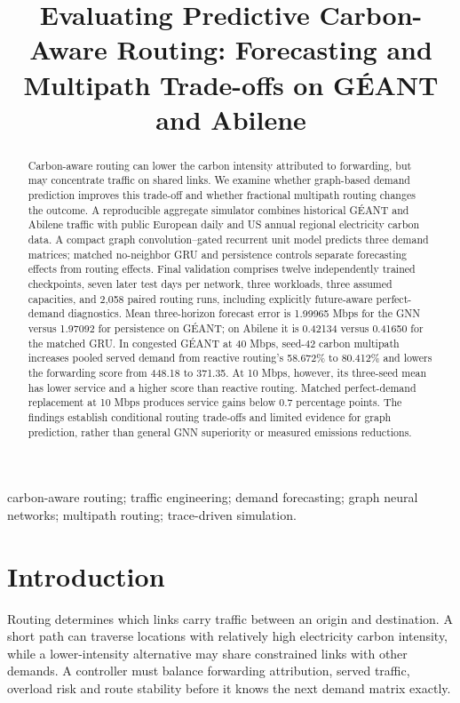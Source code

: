 \documentclass[conference,letterpaper]{IEEEtran}
\title{Evaluating Predictive Carbon-Aware Routing:
Forecasting and Multipath Trade-offs on G\'{E}ANT and Abilene}
\author{\IEEEauthorblockN{Ashutosh Gupta}
\and\IEEEauthorblockN{Tanay Mohta}
\and\IEEEauthorblockN{Avaneesh Chavan}}
\begin{document}
\maketitle

\begin{abstract}
Carbon-aware routing can lower the carbon intensity attributed to forwarding, but may concentrate traffic on shared links. We examine whether graph-based demand prediction improves this trade-off and whether fractional multipath routing changes the outcome. A reproducible aggregate simulator combines historical GÉANT and Abilene traffic with public European daily and US annual regional electricity carbon data. A compact graph convolution--gated recurrent unit model predicts three demand matrices; matched no-neighbor GRU and persistence controls separate forecasting effects from routing effects. Final validation comprises twelve independently trained checkpoints, seven later test days per network, three workloads, three assumed capacities, and 2,058 paired routing runs, including explicitly future-aware perfect-demand diagnostics. Mean three-horizon forecast error is 1.99965 Mbps for the GNN versus 1.97092 for persistence on GÉANT; on Abilene it is 0.42134 versus 0.41650 for the matched GRU. In congested GÉANT at 40 Mbps, seed-42 carbon multipath increases pooled served demand from reactive routing's 58.672\% to 80.412\% and lowers the forwarding score from 448.18 to 371.35. At 10 Mbps, however, its three-seed mean has lower service and a higher score than reactive routing. Matched perfect-demand replacement at 10 Mbps produces service gains below 0.7 percentage points. The findings establish conditional routing trade-offs and limited evidence for graph prediction, rather than general GNN superiority or measured emissions reductions.
\end{abstract}

\begin{IEEEkeywords}
carbon-aware routing; traffic engineering; demand forecasting; graph neural networks; multipath routing; trace-driven simulation.
\end{IEEEkeywords}

\section{Introduction}

Routing determines which links carry traffic between an origin and destination. A short path can traverse locations with relatively high electricity carbon intensity, while a lower-intensity alternative may share constrained links with other demands. A controller must balance forwarding attribution, served traffic, overload risk and route stability before it knows the next demand matrix exactly.
\end{document}

